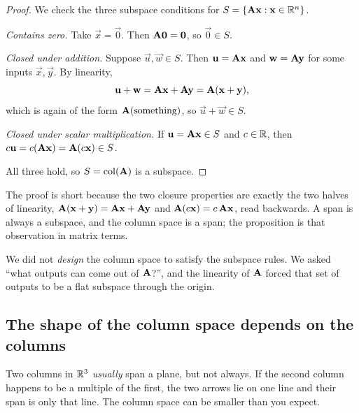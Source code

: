 \begin{proof}
We check the three subspace conditions for $S = \{\mathbf{A}\mathbf{x}:\mathbf{x}\in\mathbb{R}^n\}$.

\emph{Contains zero.} Take $\vec{x}=\vec{0}$. Then $\mathbf{A}\mathbf{0}=\mathbf{0}$, so
$\vec{0}\in S$.

\emph{Closed under addition.} Suppose $\vec{u},\vec{w}\in S$. Then $\mathbf{u}
= \mathbf{A}\mathbf{x}$ and $\mathbf{w}=\mathbf{A}\mathbf{y}$ for some inputs $\vec{x},\vec{y}$.
By linearity,
\[
  \mathbf{u}+\mathbf{w} = \mathbf{A}\mathbf{x}+\mathbf{A}\mathbf{y} = \mathbf{A}(\mathbf{x}+\mathbf{y}),
\]
which is again of the form $\mathbf{A}(\text{something})$, so $\vec{u}+\vec{w}\in S$.

\emph{Closed under scalar multiplication.} If $\mathbf{u}=\mathbf{A}\mathbf{x}\in S$ and
$c\in\mathbb{R}$, then $c\mathbf{u} = c(\mathbf{A}\mathbf{x}) = \mathbf{A}(c\mathbf{x})\in S$.

All three hold, so $S=\operatorname{col}(\mathbf{A})$ is a subspace. \qedhere
\end{proof}

The proof is short because the two closure
properties are exactly the two halves of linearity, $\mathbf{A}(\mathbf{x}+\mathbf{y})
= \mathbf{A}\mathbf{x}+\mathbf{A}\mathbf{y}$ and $\mathbf{A}(c\mathbf{x}) = c\,\mathbf{A}\mathbf{x}$, read
backwards. A span is always a subspace, and the column space is a span; the
proposition is that observation in matrix terms.

\begin{aestheticbox}
We did not \emph{design} the column space to satisfy the subspace
rules. We asked ``what outputs can come out of $\mathbf{A}$?'', and the
linearity of $\mathbf{A}$ forced that set of outputs to be a flat
subspace through the origin.
\end{aestheticbox}

\subsection{The shape of the column space depends on the columns}

Two columns in $\mathbb{R}^3$ \emph{usually} span a plane, but not always. If the second
column happens to be a multiple of the first, the two arrows lie on one line and
their span is only that line. The column space can be smaller than you expect.

